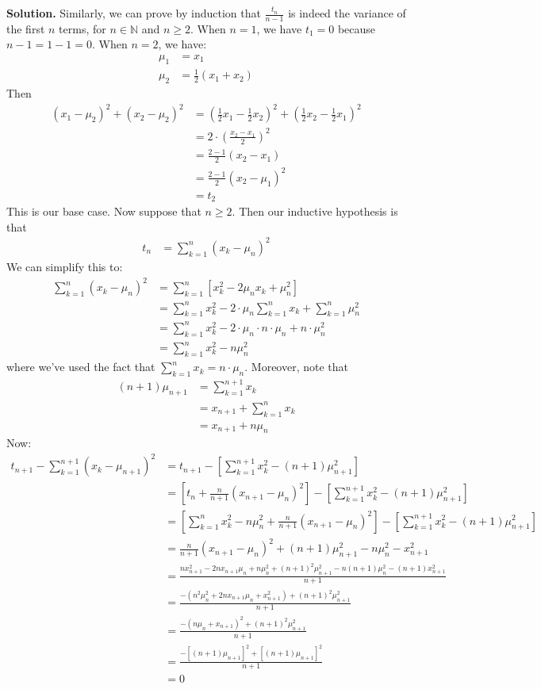 \documentclass[12pt, a4paper]{article}
\newenvironment{sol}[1][Solution]
{\par\medskip\noindent \textbf{#1.} }
{\medskip}
\begin{document}
\begin{sol}
		Similarly, we can prove by induction that $\frac{t_n}{n-1}$ is indeed the
		variance of the first $n$ terms, for $n\in\mathbb{N}$ and $n\geq 2$.
		When $n=1$, we have $t_1=0$ because $n-1=1-1=0$. When $n=2$, we have:
		\begin{align*}
			\mu_1 &= x_1\\
			\mu_2 &= \frac{1}{2}(x_1+x_2)
		\end{align*}
		Then
		\begin{align*}
			(x_1-\mu_2)^2 + (x_2-\mu_2)^2 &= \left(\frac{1}{2}x_1-\frac{1}{2}x_2\right)^2
			+\left(\frac{1}{2}x_2-\frac{1}{2}x_1\right)^2\\
			&=2\cdot \left(\frac{x_2-x_1}{2}\right)^2\\
			&=\frac{2-1}{2}\left(x_2-x_1\right)\\
			&=\frac{2-1}{2}(x_2-\mu_1)^2\\
			&= t_2
		\end{align*}
		This is our base case. Now suppose that $n \geq 2$. Then our inductive hypothesis
		is that
		\begin{align*}
			t_n &= \sum_{k=1}^{n}(x_k-\mu_{n})^2
		\end{align*}
		We can simplify this to:
		\begin{align*}
			 \sum_{k=1}^{n}(x_k-\mu_{n})^2
			 &=\sum_{k=1}^{n}[x_k^2-2\mu_nx_k+\mu_n^2]\\
			 &= \sum_{k=1}^{n}x_k^2 - 2\cdot \mu_n\sum_{k=1}^{n}x_k
			+\sum_{k=1}^{n}\mu_n^2\\
			&=\sum_{k=1}^{n}x_k^2-2\cdot\mu_n\cdot n\cdot\mu_n+n\cdot \mu_n^2\\
			&=\sum_{k=1}^{n}x_k^2-n\mu_n^2
		\end{align*}
		where we've used the fact that $\sum_{k=1}^{n}x_k=n\cdot \mu_n$.
		Moreover, note that
		\begin{align*}
			(n+1)\mu_{n+1}&=\sum_{k=1}^{n+1}x_k\\
			&=x_{n+1}+\sum_{k=1}^{n}x_k\\
			&=x_{n+1}+n\mu_n
		\end{align*}
		Now:
		\begin{align*}
			t_{n+1} - \sum_{k=1}^{n+1}(x_{k}-\mu_{n+1})^2 &=t_{n+1}
			-\left[\sum_{k=1}^{n+1}x_{k}^2-(n+1)\mu_{n+1}^2\right]\\
			&=\left[t_{n}+\frac{n}{n+1}(x_{n+1}-\mu_n)^2\right]
			-\left[\sum_{k=1}^{n+1}x_{k}^2-(n+1)\mu_{n+1}^2\right]\\
			&=\left[\sum_{k=1}^{n}x_k^2-n\mu_{n}^2+\frac{n}{n+1}(x_{n+1}-\mu_n)^2\right]
			-\left[\sum_{k=1}^{n+1}x_{k}^2-(n+1)\mu_{n+1}^2\right]
			\\
			&=\frac{n}{n+1}(x_{n+1}-\mu_n)^2+(n+1)\mu_{n+1}^2-n\mu_n^2-x_{n+1}^2\\
			&=\frac{nx_{n+1}^2-2nx_{n+1}\mu_n+n\mu_n^2+(n+1)^2\mu_{n+1}^2
			-n(n+1)\mu_n^2-(n+1)x_{n+1}^2}{n+1}\\
			&=\frac{-(n^2\mu_{n}^2+2nx_{n+1}\mu_n+x_{n+1}^2)+(n+1)^2\mu_{n+1}^2}{n+1}\\
			&=\frac{-(n\mu_n+x_{n+1})^2+(n+1)^2\mu_{n+1}^2}{n+1}\\
			&=\frac{-[(n+1)\mu_{n+1}]^2+[(n+1)\mu_{n+1}]^2}{n+1}\\
			&=0
		\end{align*}
	\end{sol}
	\pagebreak
	\printbibliography
\end{document}
